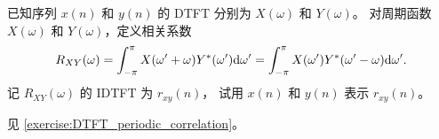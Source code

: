 \begin{homework}
    已知序列 $x(n)$ 和 $y(n)$ 的 DTFT 分别为 $X(\omega)$ 和 $Y(\omega)$。
    对周期函数 $X(\omega)$ 和 $Y(\omega)$，定义相关系数
    \begin{align*}
        R_{XY}(\omega) = \int_{-\pi}^{\pi}X(\omega' + \omega)Y^*(\omega')\mathrm{d}\omega'
            = \int_{-\pi}^{\pi}X(\omega')Y^*(\omega' - \omega)\mathrm{d}\omega'.
    \end{align*}
    记 $R_{XY}(\omega)$ 的 IDTFT 为 $r_{xy}(n)$，
    试用 $x(n)$ 和 $y(n)$ 表示 $r_{xy}(n)$。
\end{homework}

\begin{solution}
    见 \ref{exercise:DTFT_periodic_correlation}。
\end{solution}
